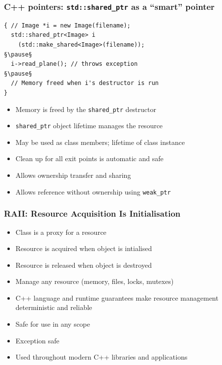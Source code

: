 \documentclass[handout]{beamer}
\begin{document}
\begin{frame}[fragile]
  \frametitle{C++ pointers: \texttt{std::shared\_ptr} as a “smart” pointer}
  \begin{lstlisting}
{ // Image *i = new Image(filename);
  std::shared_ptr<Image> i
    (std::make_shared<Image>(filename));
§\pause§
  i->read_plane(); // throws exception
§\pause§
  // Memory freed when i's destructor is run
}
\end{lstlisting}
  \begin{itemize}
    \item Memory is freed by the \texttt{shared\_ptr} destructor
      \pause
    \item \texttt{shared\_ptr} object lifetime manages the resource
      \pause
    \item May be used as class members; lifetime of class instance
      \pause
    \item Clean up for all exit points is automatic and safe
      \pause
    \item Allows ownership transfer and sharing
      \pause
    \item Allows reference without ownership using \texttt{weak\_ptr}
  \end{itemize}
\end{frame}

\begin{frame}[fragile]
  \frametitle{RAII: Resource Acquisition Is Initialisation}
    \begin{itemize}
      \pause
    \item Class is a proxy for a resource
      \pause
    \item Resource is acquired when object is intialised
    \item Resource is released when object is destroyed
      \pause
    \item Manage any resource (memory, files, locks, mutexes)
      \pause
    \item C++ language and runtime guarantees make resource management
      deterministic and reliable
      \pause
    \item Safe for use in any scope
      \pause
    \item Exception safe
      \pause
    \item Used throughout modern C++ libraries and applications
    \end{itemize}
\end{frame}
\end{document}
